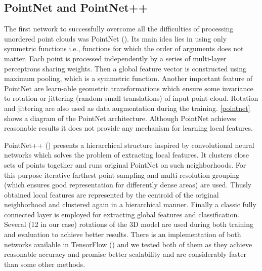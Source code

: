 \subsection{PointNet and PointNet++}
The first network to successfully overcome all the difficulties of processing unordered point clouds was PointNet (\cite{qi_pointnet:_2016}). Its main idea lies in using only symmetric functions i.e., functions for which the order of arguments does not matter. Each point is processed independently by a series of multi-layer perceptrons sharing weights. Then a global feature vector is constructed using maximum pooling, which is a symmetric function. Another important feature of PointNet are learn-able geometric transformations which ensure some invariance to rotation or jittering (random small translations) of input point cloud. Rotation and jittering are also used as data augmentation during the training. \autoref{pointnet} shows a diagram of the PointNet architecture.
Although PointNet achieves reasonable results it does not provide any mechanism for learning local features.\par 
PointNet++ (\cite{qi_pointnet++:_2017}) presents a hierarchical structure inspired by convolutional neural networks which solves the problem of extracting local features. It clusters close sets of points together and runs original PointNet on such neighborhoods. For this purpose iterative farthest point sampling and multi-resolution grouping (which ensures good representation for differently dense areas) are used. Thusly obtained local features are represented by the centroid of the original neighborhood and clustered again in a hierarchical manner. Finally a classic fully connected layer is employed for extracting global features and classification.
Several (12 in our case) rotations of the 3D model are used during both training and evaluation to achieve better results. There is an implementation of both networks available in TensorFlow (\cite{qi_pointnet_2016, qi_pointnet++_2017}) and we tested both of them as they achieve reasonable accuracy and promise better scalability and are considerably faster than some other methods.



